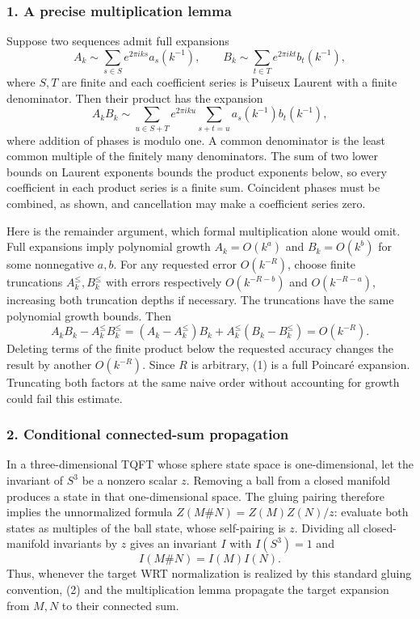 \documentclass[11pt]{article}
\begin{document}
\subsubsection{1. A precise multiplication lemma}
Suppose two sequences admit full expansions
\[A_k\sim\sum_{s\in S}e^{2\pi iks}a_s(k^{-1}),\qquad
B_k\sim\sum_{t\in T}e^{2\pi ikt}b_t(k^{-1}),\]
where $S,T$ are finite and each coefficient series is Puiseux Laurent with a finite denominator. Then their product has the expansion
\[A_kB_k\sim\sum_{u\in S+T}e^{2\pi iku}
\sum_{s+t=u}a_s(k^{-1})b_t(k^{-1}),\tag{1}\]
where addition of phases is modulo one. A common denominator is the least common multiple of the finitely many denominators. The sum of two lower bounds on Laurent exponents bounds the product exponents below, so every coefficient in each product series is a finite sum. Coincident phases must be combined, as shown, and cancellation may make a coefficient series zero.

Here is the remainder argument, which formal multiplication alone would omit. Full expansions imply polynomial growth $A_k=O(k^a)$ and $B_k=O(k^b)$ for some nonnegative $a,b$. For any requested error $O(k^{-R})$, choose finite truncations $A_k^{\le},B_k^{\le}$ with errors respectively $O(k^{-R-b})$ and $O(k^{-R-a})$, increasing both truncation depths if necessary. The truncations have the same polynomial growth bounds. Then
\[A_kB_k-A_k^{\le}B_k^{\le}
=(A_k-A_k^{\le})B_k+A_k^{\le}(B_k-B_k^{\le})=O(k^{-R}).\]
Deleting terms of the finite product below the requested accuracy changes the result by another $O(k^{-R})$. Since $R$ is arbitrary, (1) is a full Poincar\'e expansion. Truncating both factors at the same naive order without accounting for growth could fail this estimate.

\subsubsection{2. Conditional connected-sum propagation}
In a three-dimensional TQFT whose sphere state space is one-dimensional, let the invariant of $S^3$ be a nonzero scalar $z$. Removing a ball from a closed manifold produces a state in that one-dimensional space. The gluing pairing therefore implies the unnormalized formula $Z(M\#N)=Z(M)Z(N)/z$: evaluate both states as multiples of the ball state, whose self-pairing is $z$. Dividing all closed-manifold invariants by $z$ gives an invariant $I$ with $I(S^3)=1$ and
\[I(M\#N)=I(M)I(N).\tag{2}\]
Thus, whenever the target WRT normalization is realized by this standard gluing convention, (2) and the multiplication lemma propagate the target expansion from $M,N$ to their connected sum.
\end{document}
